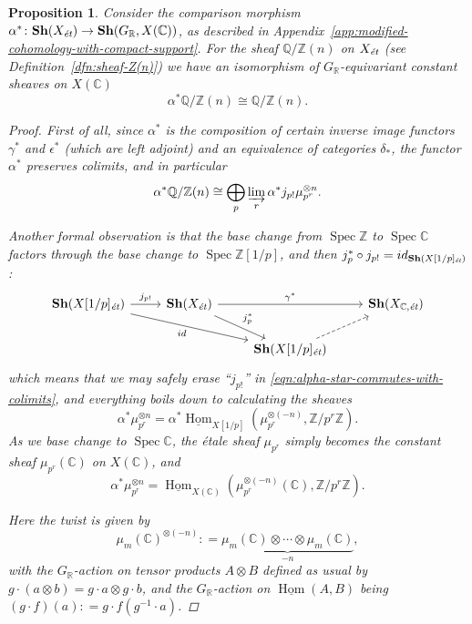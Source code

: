 \documentclass{article}
\DeclareMathOperator{\Hom}{Hom}
\DeclareMathOperator{\Spec}{Spec}
\newcommand{\CC}{\mathbb{C}}
\newcommand{\QQ}{\mathbb{Q}}
\newcommand{\RR}{\mathbb{R}}
\newcommand{\ZZ}{\mathbb{Z}}
\newcommand{\et}{\text{\it ét}}
\newcommand{\dfn}{\mathrel{\mathop:}=}
\newcommand{\iHom}{\underline{\Hom}}
\newtheorem{proposition}[theorem]{Proposition}
\theoremstyle{definition}
\numberwithin{equation}{section}
\begin{document}
\begin{proposition}
  \label{propn:image-of-QZn-under-alpha}
  Consider the comparison morphism
  $\alpha^*\colon \mathbf{Sh} (X_\et) \to \mathbf{Sh} (G_\RR, X (\CC))$,
  as described in
  Appendix~\ref{app:modified-cohomology-with-compact-support}. For the sheaf
  $\QQ/\ZZ (n)$ on $X_\et$ (see Definition~\ref{dfn:sheaf-Z(n)}) we have an
  isomorphism of $G_\RR$-equivariant constant sheaves on $X (\CC)$
  $$\alpha^* \QQ/\ZZ (n) \cong \QQ/\ZZ (n).$$

  \begin{proof}
    First of all, since $\alpha^*$ is the composition of certain inverse image
    functors $\gamma^*$ and $\epsilon^*$ (which are left adjoint) and an
    equivalence of categories $\delta_*$, the functor $\alpha^*$ preserves
    colimits, and in particular
    \begin{equation}
      \label{eqn:alpha-star-commutes-with-colimits}
      \alpha^* \QQ/\ZZ (n) \cong \bigoplus_p \varinjlim_r \alpha^* j_{p!} \mu_{p^r}^{\otimes n}.
    \end{equation}

    Another formal observation is that the base change from $\Spec \ZZ$ to
    $\Spec \CC$ factors through the base change to $\Spec \ZZ [1/p]$, and then
    $j_p^* \circ j_{p!} = id_{\mathbf{Sh} (X [1/p]_\et)}$:
    \[ \begin{tikzcd}
      \mathbf{Sh} (X [1/p]_\et) \ar{r}{j_{p!}}\ar{drr}[swap]{id} & \mathbf{Sh} (X_\et) \ar{rr}{\gamma^*}\ar{dr}{j_p^*} & & \mathbf{Sh} (X_{\CC,\text{\it ét}}) \\
      & & \mathbf{Sh} (X [1/p]_\et)\ar[dashed]{ur}
    \end{tikzcd} \]
    which means that we may safely erase ``$j_{p!}$'' in
    \eqref{eqn:alpha-star-commutes-with-colimits}, and everything boils down to
    calculating the sheaves
    $$\alpha^* \mu_{p^r}^{\otimes n} = \alpha^* \iHom_{X [1/p]} (\mu_{p^r}^{\otimes (-n)}, \ZZ/p^r \ZZ).$$
    As we base change to $\Spec \CC$, the étale sheaf $\mu_{p^r}$ simply becomes
    the constant sheaf $\mu_{p^r} (\CC)$ on $X (\CC)$, and
    $$\alpha^* \mu_{p^r}^{\otimes n} = \iHom_{X (\CC)} (\mu_{p^r}^{\otimes (-n)} (\CC), \ZZ/p^r \ZZ).$$

    Here the twist is given by
    $$\mu_m (\CC)^{\otimes (-n)} \dfn \underbrace{\mu_m (\CC)\otimes\cdots\otimes\mu_m (\CC)}_{-n},$$
    with the $G_\RR$-action on tensor products $A\otimes B$ defined as usual
    by $g\cdot (a\otimes b) = g\cdot a\otimes g\cdot b$, and the
    $G_\RR$-action on $\iHom (A,B)$ being
    $(g\cdot f) (a) \dfn g\cdot f (g^{-1}\cdot a)$.


\end{proof}
\end{proposition}
\end{document}
